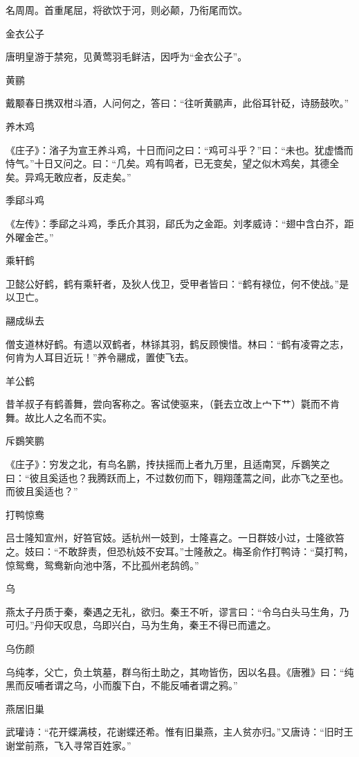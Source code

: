 \documentclass[a4paper,12pt,UTF8,twoside]{ctexbook}
\begin{document}
    名周周。首重尾屈，将欲饮于河，则必颠，乃衔尾而饮。
    
    金衣公子
    
    唐明皇游于禁宛，见黄莺羽毛鲜洁，因呼为“金衣公子”。
    
    黄鹂
    
    戴颙春日携双柑斗酒，人问何之，答曰：“往听黄鹂声，此俗耳针砭，诗肠鼓吹。”
    
    养木鸡
    
    《庄子》：渻子为宣王养斗鸡，十日而问之曰：“鸡可斗乎？”曰：“未也。犹虚憍而恃气。”十日又问之。曰：“几矣。鸡有鸣者，已无变矣，望之似木鸡矣，其德全矣。异鸡无敢应者，反走矣。”
    
    季郈斗鸡
    
    《左传》：季郈之斗鸡，季氏介其羽，郈氏为之金距。刘孝威诗：“翅中含白芥，距外曜金芒。”
    
    乘轩鹤
    
    卫懿公好鹤，鹤有乘轩者，及狄人伐卫，受甲者皆曰：“鹤有禄位，何不使战。”是以卫亡。
    
    翮成纵去
    
    僧支道林好鹤。有遗以双鹤者，林铩其羽，鹤反顾懊惜。林曰：“鹤有凌霄之志，何肯为人耳目近玩！”养令翮成，置使飞去。
    
    羊公鹤
    
    昔羊叔子有鹤善舞，尝向客称之。客试使驱来，（氃去立改上宀下艹）氋而不肯舞。故比人之名而不实。
    
    斥鷃笑鹏
    
    《庄子》：穷发之北，有鸟名鹏，抟扶摇而上者九万里，且适南冥，斥鷃笑之曰：“彼且奚适也？我腾跃而上，不过数仞而下，翱翔蓬蒿之间，此亦飞之至也。而彼且奚适也？”
    
    打鸭惊鸯
    
    吕士隆知宣州，好笞官妓。适杭州一妓到，士隆喜之。一日群妓小过，士隆欲笞之。妓曰：“不敢辞责，但恐杭妓不安耳。”士隆赦之。梅圣俞作打鸭诗：“莫打鸭，惊鸳鸯，鸳鸯新向池中落，不比孤州老鸹鸧。”
    
    乌
    
    燕太子丹质于秦，秦遇之无礼，欲归。秦王不听，谬言曰：“令乌白头马生角，乃可归。”丹仰天叹息，乌即兴白，马为生角，秦王不得已而遣之。
    
    乌伤颜
    
    乌纯孝，父亡，负土筑墓，群乌衔土助之，其吻皆伤，因以名县。《唐雅》曰：“纯黑而反哺者谓之乌，小而腹下白，不能反哺者谓之鸦。”
    
    燕居旧巢
    
    武瓘诗：“花开蝶满枝，花谢蝶还希。惟有旧巢燕，主人贫亦归。”又唐诗：“旧时王谢堂前燕，飞入寻常百姓家。”
    
\end{document}
